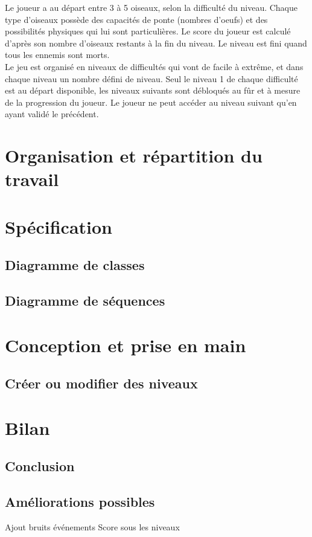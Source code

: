 \documentclass[a4paper,12pt]{report}
\begin{document}
Le joueur a au départ entre 3 à 5 oiseaux, selon la difficulté du niveau. Chaque type d'oiseaux possède des 
capacités de ponte (nombres d'oeufs) et des possibilités physiques qui lui sont particulières. Le score du joueur est calculé d'après
son nombre d'oiseaux restants à la fin du niveau. Le niveau est fini quand tous les ennemis sont morts.\\

Le jeu est organisé en niveaux de difficultés qui vont de facile à extrême, et dans chaque niveau un nombre défini de niveau.
Seul le niveau 1 de chaque difficulté est au départ disponible, les niveaux 
suivants sont débloqués au fûr et à mesure de la progression du joueur. 
Le joueur ne peut accéder au niveau suivant qu'en ayant validé le précédent.\\
 

\chapter{Organisation et répartition du travail}

\chapter{Spécification}
\section{Diagramme de classes}
\section{Diagramme de séquences}

\chapter{Conception et prise en main}
\section{Créer ou modifier des niveaux}

\chapter{Bilan}
\section{Conclusion}
\section{Améliorations possibles}
Ajout bruits événements
Score sous les niveaux
\end{document}
